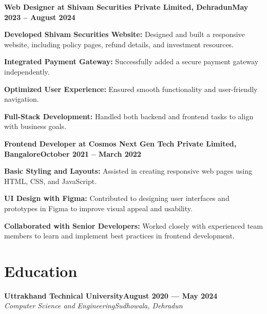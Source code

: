 \documentclass[letterpaper,10pt]{article}
\newcommand{\heading}[2]{
  \hspace{10pt}#1\hfill#2\\
}
\newcommand{\headingBf}[2]{
  \heading{\textbf{#1}}{\textbf{#2}}
}
\newcommand{\headingIt}[2]{
  \heading{\textit{#1}}{\textit{#2}}
}
\newenvironment{resume_list}{
  \vspace{-7pt}
  \begin{itemize}[itemsep=-2px, parsep=1pt, leftmargin=30pt]
}{
  \end{itemize}
}
\begin{document}
  \headingBf{
Web Designer at Shivam Securities Private Limited, Dehradun}{May 2023 -- August 2024}
  \begin{resume_list}
    \item \textbf{Developed Shivam Securities Website:} Designed and built a responsive website, including policy pages, refund details, and investment resources.
    \item \textbf{Integrated Payment Gateway:} Successfully added a secure payment gateway independently.
    \item \textbf{Optimized User Experience:} Ensured smooth functionality and user-friendly navigation.
    \item \textbf{Full-Stack Development:} Handled both backend and frontend tasks to align with business goals.
  \end{resume_list}

  \headingBf{Frontend Developer at Cosmos Next Gen Tech Private Limited, Bangalore}{October 2021 -- March 2022}
  \begin{resume_list}
    \item \textbf{Basic Styling and Layouts:} Assisted in creating responsive web pages using HTML, CSS, and JavaScript.
    \item \textbf{UI Design with Figma:} Contributed to designing user interfaces and prototypes in Figma to improve visual appeal and usability.
    \item \textbf{Collaborated with Senior Developers:} Worked closely with experienced team members to learn and implement best practices in frontend development.
  \end{resume_list}


  \section{Education}

  \headingBf{Uttrakhand Technical University}{August 2020 — May 2024} %
  \headingIt{Computer Science and Engineering}{Sudhowala, Dehradun}


\end{document}

